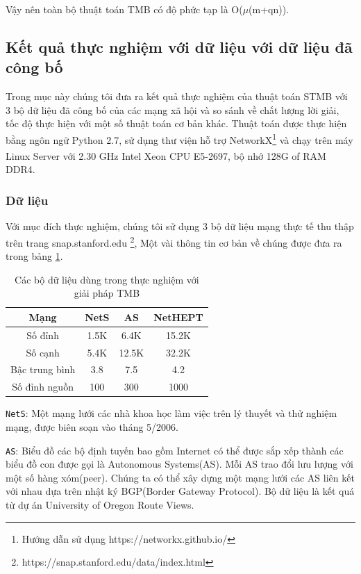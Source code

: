 Vậy nên toàn bộ thuật toán TMB có độ phức tạp là O($\mu$(m+qn)).

\subsection{Kết quả thực nghiệm với dữ liệu với dữ liệu đã công bố}	

Trong mục này chúng tôi đưa ra kết quả thực nghiệm của thuật toán STMB với 3 bộ dữ liệu đã công bố của các mạng xã hội và so sánh về chất lượng lời giải, tốc độ thực hiện với một số thuật toán cơ bản khác.
Thuật toán được thực hiện bằng ngôn ngữ Python 2.7, sử dụng thư viện hỗ trợ NetworkX\footnote{Hướng dẫn sử dụng https://networkx.github.io/} và chạy trên máy Linux Server với 2.30 GHz Intel\textsuperscript{\textregistered} Xeon\textsuperscript{\textregistered} CPU E5-2697, bộ nhớ 128G of RAM DDR4.
\subsubsection{Dữ liệu}
Với mục đích thực nghiệm, chúng tôi sử dụng 3 bộ dữ liệu mạng thực tế thu thập trên trang snap.stanford.edu \footnote{https://snap.stanford.edu/data/index.html}, Một vài thông tin cơ bản về chúng được đưa ra trong bảng \ref{TMB:table}. 
\begin{table}[h]
	\centering
	\begin{tabular}{|c|c|c|c|}
		\hline 
		Mạng & NetS & AS & NetHEPT\\ 
		\hline 
		Số đỉnh & 1.5K & 6.4K & 15.2K \\ 
		\hline 
		Số cạnh & 5.4K & 12.5K & 32.2K\\ 
		\hline 
		Bậc trung bình & 3.8 & 7.5 & 4.2\\ 
		\hline 
		Số đỉnh nguồn & 100 & 300 & 1000\\ 
		\hline 
	\end{tabular} 
	\caption{Các bộ dữ liệu dùng trong thực nghiệm với giải pháp TMB}
	\label{TMB:table}
\end{table}

\texttt{NetS}\cite{NetS}: Một mạng lưới các nhà khoa học làm việc trên lý thuyết và thử nghiệm mạng, được biên soạn vào tháng 5/2006.

\texttt{AS}\cite{AS}: Biểu đồ các bộ định tuyến bao gồm Internet có thể được sắp xếp thành các biểu đồ con được gọi là Autonomous Systems(AS). Mỗi AS trao đổi lưu lượng với một số hàng xóm(peer). Chúng ta có thể xây dựng một mạng lưới các AS liên kết với nhau dựa trên nhật ký BGP(Border Gateway Protocol). Bộ dữ liệu là kết quá từ dự án University of Oregon Route Views. 

